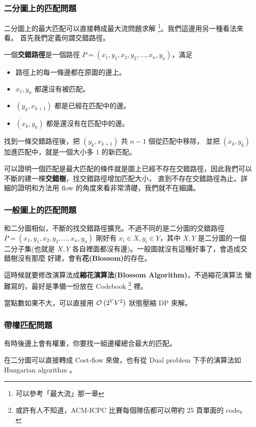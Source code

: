 \documentclass[a4paper,12pt]{book}
\begin{document}
\subsubsection{二分圖上的匹配問題}
二分圖上的最大匹配可以直接轉成最大流問題求解
\footnote{可以參考「最大流」那一章}。我們這邊用另一種看法來看。
首先我們定義何謂交錯路徑。
\begin{theorem}[定義]
  一個{\bf 交錯路徑}是一個路徑 $P = (x_1, y_1, x_2, y_2, \dots, x_n, y_n)$，滿足
  \begin{itemize}
    \item 路徑上的每一條邊都在原圖的邊上。
    \item $x_1, y_n$ 都還沒有被匹配。
    \item $(y_k, x_{k+1})$ 都是已經在匹配中的邊。
    \item $(x_k, y_{k})$ 都是還沒有在匹配中的邊。
  \end{itemize}
  找到一條交錯路徑後，把 $(y_k, x_{k+1})$ 共 $n-1$ 個從匹配中移除，
  並把 $(x_k, y_k)$ 加進匹配中，就是一個大小多 $1$ 的新匹配。
\end{theorem}
可以證明一個匹配是最大匹配的條件就是圖上已經不存在交錯路徑，因此我們可以
不斷的建一棵{\bf 交錯樹}，找交錯路徑增加匹配大小，
直到不存在交錯路徑為止。詳細的證明和方法用
flow 的角度來看非常清礎，我們就不在細講。

\subsubsection{一般圖上的匹配問題}
和二分圖相似，不斷的找交錯路徑擴充。不過不同的是二分圖的交錯路徑 \\
$P = (x_1, y_1, x_2, y_2, \dots, x_n, y_n)$ 剛好有 
$x_i \in X, y_i \in Y$，其中 $X, Y$ 是二分圖的一個二分子集(也就是
$X, Y$ 各自裡面都沒有邊)。一般圖就沒有這種好事了，會造成交錯樹沒有那麼
好建，會有{\bf 花(Blossom)}的存在。

這時候就要修改演算法成{\bf 縮花演算法(Blossom Algorithm)}，不過縮花演算法
蠻難寫的，最好是準備一份放在 Codebook 
\footnote{或許有人不知道，ACM-ICPC 比賽每個隊伍都可以帶約 25 頁單面的 code。}
裡。

當點數如果不大，可以直接用 $\operatorname{\mathcal{O}}\left(2^V V^2\right)$ 狀態壓縮 DP 來解。

\subsubsection{帶權匹配問題}
有時後邊上會有權重，你要找一組邊權總合最大的匹配。

在二分圖可以直接轉成 Cost-flow 來做，也有從 Dual problem 下手的演算法如
Hungarian algorithm 。
\end{document}
